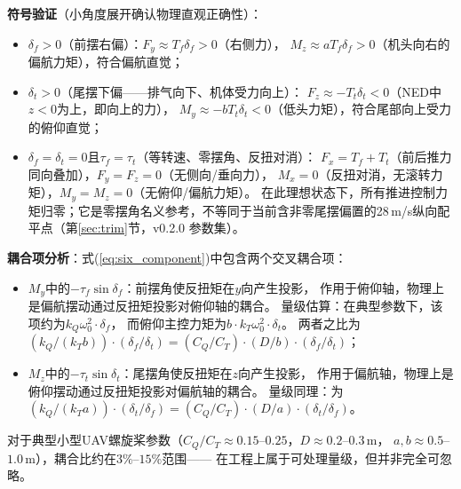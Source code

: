 \textbf{符号验证}（小角度展开确认物理直观正确性）：
\begin{itemize}
    \item $\delta_f > 0$（前摆右偏）：$F_y \approx T_f \delta_f > 0$（右侧力），
          $M_z \approx a T_f \delta_f > 0$（机头向右的偏航力矩），符合偏航直觉；
    \item $\delta_t > 0$（尾摆下偏——排气向下、机体受力向上）：
          $F_z \approx -T_t \delta_t < 0$（NED中$z<0$为上，即向上的力），
          $M_y \approx -b T_t \delta_t < 0$（低头力矩），符合尾部向上受力的俯仰直觉；
    \item $\delta_f = \delta_t = 0$且$\tau_f = \tau_t$（等转速、零摆角、反扭对消）：
          $F_x = T_f + T_t$（前后推力同向叠加），$F_y = F_z = 0$（无侧向/垂向力），
          $M_x = 0$（反扭对消，无滚转力矩），$M_y = M_z = 0$（无俯仰/偏航力矩）。
          在此理想状态下，所有推进控制力矩归零；它是零摆角名义参考，不等同于当前含非零尾摆偏置的28\,m/s纵向配平点（第\ref{sec:trim}节，v0.2.0 参数集）。
\end{itemize}

\textbf{耦合项分析}：式(\ref{eq:six_component})中包含两个交叉耦合项：
\begin{itemize}
    \item $M_y$中的$-\tau_f \sin\delta_f$：前摆角使反扭矩在$y$向产生投影，
          作用于俯仰轴，物理上是偏航摆动通过反扭矩投影对俯仰轴的耦合。
          量级估算：在典型参数下，该项约为$k_Q \omega_0^2 \cdot \delta_f$，
          而俯仰主控力矩为$b \cdot k_T \omega_0^2 \cdot \delta_t$。
          两者之比为$(k_Q / (k_T b)) \cdot (\delta_f/\delta_t)
          = (C_Q/C_T) \cdot (D/b) \cdot (\delta_f/\delta_t)$；
    \item $M_z$中的$-\tau_t \sin\delta_t$：尾摆角使反扭矩在$z$向产生投影，
          作用于偏航轴，物理上是俯仰摆动通过反扭矩投影对偏航轴的耦合。
          量级同理：为$(k_Q / (k_T a)) \cdot (\delta_t/\delta_f)
          = (C_Q/C_T) \cdot (D/a) \cdot (\delta_t/\delta_f)$。
\end{itemize}

对于典型小型UAV螺旋桨参数（$C_Q/C_T \approx 0.15$--$0.25$，$D \approx 0.2$--$0.3$\,m，
$a, b \approx 0.5$--$1.0$\,m），耦合比约在$3\%$--$15\%$范围——
在工程上属于可处理量级，但并非完全可忽略。
